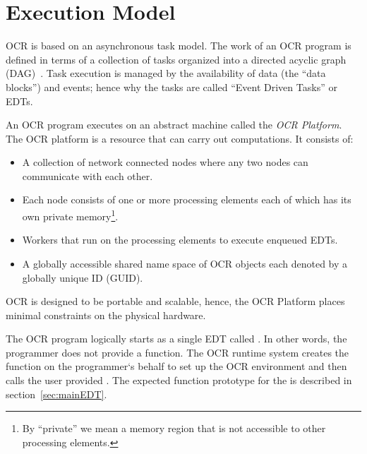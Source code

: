 %

\section{Execution Model}
\label{sec:ExecutionModel}

OCR is based on an asynchronous task model.   The work of an OCR program
is defined in terms of a collection of tasks  organized
into a directed acyclic graph (DAG)~\cite{TaSa11,Tasirlar11,Zuckerman:2011:UCP:2000417.2000424}.
Task execution is managed by the availability of data (the ``data blocks'') and events; hence why
the tasks are called ``Event Driven Tasks'' or EDTs.

An OCR program executes on an abstract machine called the \emph{OCR
Platform}.  The OCR platform is a resource that can carry out
computations. It consists of:
\begin{itemize}
\item A collection of network connected nodes where any two nodes can
communicate with each other.
\item Each node consists of one or more processing elements each of
which has its own private memory\footnote{By ``private'' we mean a
memory region that is not accessible to other processing
elements.}.
\item Workers that run on the processing elements to execute enqueued EDTs.
\item A globally accessible shared name space of OCR objects each
denoted by a globally unique ID (GUID).
\end{itemize}
OCR is designed to be portable and scalable, hence, the OCR Platform
places minimal constraints on the physical hardware.


%
%

The OCR program logically starts as a single  EDT called  .
In other words, the programmer does not provide a  function.
The OCR runtime system creates the  function on the programmer`s
behalf to set up the
OCR environment and then calls the user provided . The expected
function prototype for the  is described in section~\ref{sec:mainEDT}.

